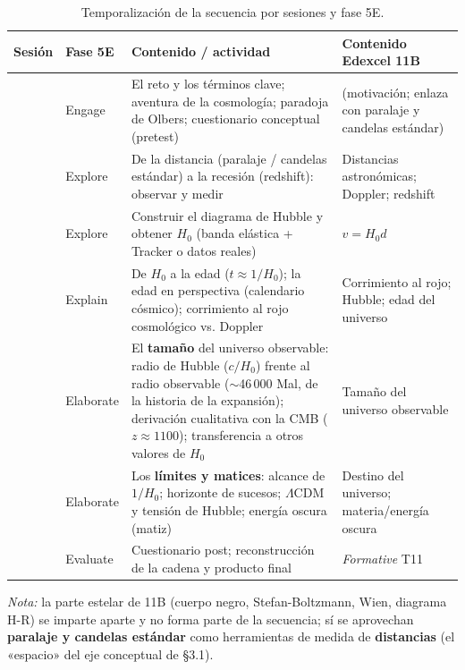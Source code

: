 \begin{table}[ht]
\centering
\caption{Temporalización de la secuencia por sesiones y fase 5E.}\label{tab:temporalizacion}
\begin{tabularx}{\textwidth}{|>{\raggedright\arraybackslash}p{1.3cm}|>{\raggedright\arraybackslash}p{1.7cm}|>{\raggedright\arraybackslash}X|>{\raggedright\arraybackslash}p{3.2cm}|}
\hline
\rowcolor{naranja}
{\color{white}\textbf{Sesión}} & {\color{white}\textbf{Fase 5E}} & {\color{white}\textbf{Contenido / actividad}} & {\color{white}\textbf{Contenido Edexcel 11B}} \\ \hline
1 & Engage & El reto y los términos clave; aventura de la cosmología; paradoja de Olbers; cuestionario conceptual (pretest) & (motivación; enlaza con paralaje y candelas estándar) \\ \hline
2 & Explore & De la distancia (paralaje / candelas estándar) a la recesión (redshift): observar y medir & Distancias astronómicas; Doppler; redshift \\ \hline
3 & Explore & Construir el diagrama de Hubble y obtener $H_{0}$ (banda elástica + Tracker o datos reales) & $v = H_{0}d$ \\ \hline
4 & Explain & De $H_{0}$ a la edad ($t \approx 1/H_{0}$); la edad en perspectiva (calendario cósmico); corrimiento al rojo cosmológico vs. Doppler & Corrimiento al rojo; Hubble; edad del universo \\ \hline
5 & Elaborate & El \textbf{tamaño} del universo observable: radio de Hubble ($c/H_{0}$) frente al radio observable ($\sim$46\,000 Mal, de la historia de la expansión); derivación cualitativa con la CMB ($z \approx 1100$); transferencia a otros valores de $H_{0}$ & Tamaño del universo observable \\ \hline
6 & Elaborate & Los \textbf{límites y matices}: alcance de $1/H_{0}$; horizonte de sucesos; $\Lambda$CDM y tensión de Hubble; energía oscura (matiz) & Destino del universo; materia/energía oscura \\ \hline
7 & Evaluate & Cuestionario post; reconstrucción de la cadena y producto final & \textit{Formative} T11 \\ \hline
\end{tabularx}
\end{table}

\textit{Nota:} la parte estelar de 11B (cuerpo negro, Stefan-Boltzmann, Wien, diagrama H-R) se imparte aparte y no forma parte de la secuencia; sí se aprovechan \textbf{paralaje y candelas estándar} como herramientas de medida de \textbf{distancias} (el «espacio» del eje conceptual de §3.1).

